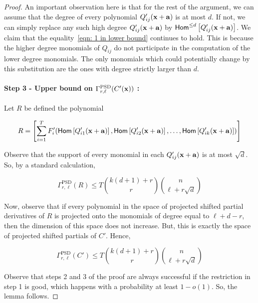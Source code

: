 \begin{proof}
An important observation here is that for the rest of the argument, we can assume that the degree of every polynomial $Q_{ij}'(\mathbf{x} + \mathbf{a})$ is at most $d$. If not, we can simply replace any such high degree $Q_{ij}'(\mathbf{x} + \mathbf{a})$ by 
$\mathsf{Hom}^{\leq d}\left[Q_{ij}'(\mathbf{x} + \mathbf{a})\right]$. We claim that the equality~\ref{eqn: 1 in lower bound} continues to hold. 
This is because the higher degree monomials of $Q_{ij}$ do not participate in the computation of the lower degree monomials. The only monomials which could potentially change by this substitution are the ones with degree strictly larger than  $d$. 
\paragraph{Step 3 - Upper bound on $\Gamma_{r,\ell}^{\text{PSD}}(C'(\mathbf{x}))$ :}
Let $R$ be defined the polynomial 

\[
R = \left[\sum_{i = 1}^T  F_{i}'(\mathsf{Hom}\left[ Q_{i1}'(\mathbf{x} + \mathbf{a})\right], \mathsf{Hom}\left[ Q_{i2}'(\mathbf{x} + \mathbf{a})\right], \ldots, \mathsf{Hom}\left[ Q_{ik}'(\mathbf{x} + \mathbf{a})\right])\right]
\]

Observe that the support of every monomial in each $Q_{ij}'(\mathbf{x}+\mathbf{a})$ is at most $\sqrt{d}$. So, by a standard calculation, 

$$\Gamma_{r, \ell}^{\text{PSD}}(R) \leq T{k(d+1) + r \choose r}{n \choose \ell + r\sqrt{d}}$$

Now, observe that if every polynomial in the space of projected shifted partial derivatives of $R$ is projected onto the monomials of degree equal to $\ell + d-r$, then the dimension of this space does not increase. But, this is exactly the space of projected shifted partials of $C'$. 
Hence,

\[
\Gamma_{r, \ell}^{\text{PSD}}(C') \leq T{k(d+1) + r \choose r}{n \choose \ell + r\sqrt{d}}
\]

Observe that steps 2 and 3 of the proof are always successful if the restriction in step 1 is good, which happens with a probability at least $1-o(1)$. So, the lemma follows. 
\end{proof}


